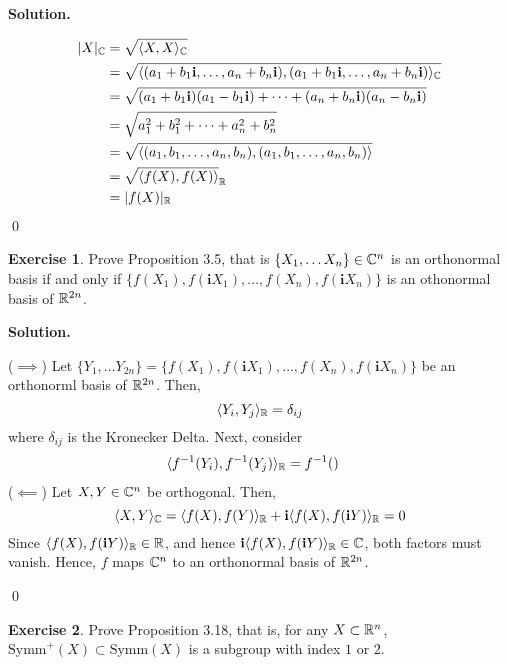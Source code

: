 \documentclass[12pt]{book}
\theoremstyle{definition}
\newtheorem{exercise}{Exercise}[chapter]
\newenvironment{solution}
{%
  \par\noindent\textbf{Solution.}\quad
}
{%
  \qed\par
}
\begin{document}
\begin{solution}
\[\begin{aligned}
    |X|_{\mathbb{C}} &= \sqrt{\langle X, X \rangle_{\mathbb{C}}} \\
           &= \sqrt{\langle (a_1 + b_1\mathbf{i}, \dots , a_n + b_n\mathbf{i}), (a_1 + b_1\mathbf{i}, \dots , a_n + b_n\mathbf{i}) \rangle_{\mathbb{C}}} \\
           &= \sqrt{(a_1 + b_1\mathbf{i})(a_1 - b_1\mathbf{i}) + \dots + (a_n + b_n\mathbf{i})(a_n - b_n\mathbf{i})} \\
           &= \sqrt{a_1^2 + b_1^2 + \dots + a_n^2 + b_n^2} \\
           &= \sqrt{\langle (a_1, b_1, \dots, a_n, b_n), (a_1, b_1, \dots, a_n, b_n) \rangle}\\
           &= \sqrt{\langle f(X), f(X) \rangle}_{\mathbb{R}} \\
           &= |f(X)|_{\mathbb{R}}
  \end{aligned}
  \]
\end{solution}

\begin{exercise}
  Prove Proposition 3.5, that is $\{X_1, \dots X_n\} \in \mathbb{C}^n$ is an orthonormal basis if and only if $\{f(X_1), f(\mathbf{i}X_1), \dots ,f(X_n), f(\mathbf{i}X_n)\}$ is an othonormal basis of $\mathbb{R}^{2n}$. 
\end{exercise}

\begin{solution}
  ($\implies$) Let $\{Y_1, \dots Y_{2n}\} = \{f(X_1), f(\mathbf{i}X_1), \dots ,f(X_n), f(\mathbf{i}X_n)\}$ be an orthonorml basis of $\mathbb{R}^{2n}$.
  Then,
  \[
  \langle Y_i, Y_j \rangle_{\mathbb{R}} = \delta_{ij}
  \]
  where $\delta_{ij}$ is the Kronecker Delta.
  Next, consider
  \[
  \begin{aligned}
    \langle f^{-1}(Y_i), f^{-1}(Y_j) \rangle_{\mathbb{R}} &= f^{-1}()
  \end{aligned}
  \]
  ($\impliedby$) Let $X, Y \in \mathbb{C}^n$ be orthogonal.
  Then,
  \[
  \langle X, Y \rangle_{\mathbb{C}} = \langle f(X), f(Y) \rangle_{\mathbb{R}} + \mathbf{i} \langle f(X), f(\mathbf{i}Y) \rangle_{\mathbb{R}} = 0
  \]
  Since $\langle f(X), f(\mathbf{i}Y) \rangle_{\mathbb{R}} \in \mathbb{R}$, and hence $\mathbf{i}\langle f(X), f(\mathbf{i}Y) \rangle_{\mathbb{R}} \in \mathbb{C}$, both factors must vanish.
  Hence, $f$ maps $\mathbb{C}^n$ to an orthonormal basis of $\mathbb{R}^{2n}$.

\end{solution}


\begin{exercise}
  Prove Proposition 3.18, that is, for any $X \subset \mathbb{R}^n$, $\text{Symm}^+(X) \subset \text{Symm}(X)$ is a subgroup with index $1$ or $2$.
\end{exercise}
\end{document}
